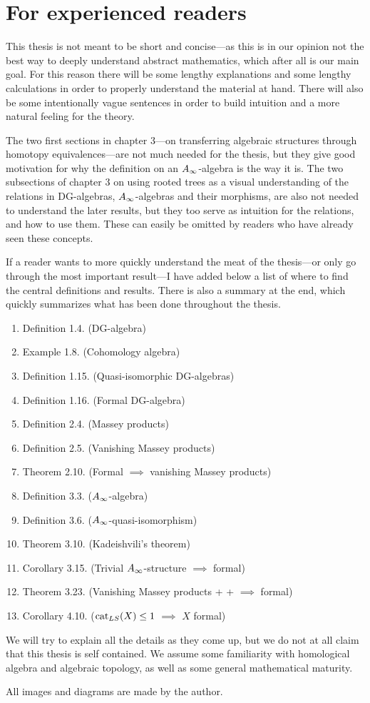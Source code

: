 

\section{For experienced readers}

This thesis is not meant to be short and concise---as this is in our opinion not the best way to deeply understand abstract mathematics, which after all is our main goal. For this reason there will be some lengthy explanations and some lengthy calculations in order to properly understand the material at hand. There will also be some intentionally vague sentences in order to build intuition and a more natural feeling for the theory. 

The two first sections in chapter 3---on transferring algebraic structures through homotopy equivalences---are not much needed for the thesis, but they give good motivation for why the definition on an $A_{\infty}$-algebra is the way it is. The two subsections of chapter 3 on using rooted trees as a visual understanding of the relations in DG-algebras, $A_{\infty}$-algebras and their morphisms, are also not needed to understand the later results, but they too serve as intuition for the relations, and how to use them. These can easily be omitted by readers who have already seen these concepts. 

If a reader wants to more quickly understand the meat of the thesis---or only go through the most important result---I have added below a list of where to find the central definitions and results. There is also a summary at the end, which quickly summarizes what has been done throughout the thesis. 

\begin{enumerate}
	\item Definition 1.4. (DG-algebra)
	\item Example 1.8. (Cohomology algebra)
	\item Definition 1.15. (Quasi-isomorphic DG-algebras)
	\item Definition 1.16. (Formal DG-algebra)
	\item Definition 2.4. (Massey products)
	\item Definition 2.5. (Vanishing Massey products)
	\item Theorem 2.10. (Formal $\implies$ vanishing Massey products)
	\item Definition 3.3. ($A_{\infty}$-algebra)
	\item Definition 3.6. ($A_{\infty}$-quasi-isomorphism)
	\item Theorem 3.10. (Kadeishvili's theorem)
	\item Corollary 3.15. (Trivial $A_{\infty}$-structure $\implies$ formal)
	\item Theorem 3.23. (Vanishing Massey products + + $\implies$ formal)
	\item Corollary 4.10. ($\text{cat}_{LS}(X)\leq 1$ $\implies$ $X$ formal)
\end{enumerate}

We will try to explain all the details as they come up, but we do not at all claim that this thesis is self contained. We assume some familiarity with homological algebra and algebraic topology, as well as some general mathematical maturity. 

All images and diagrams are made by the author. 